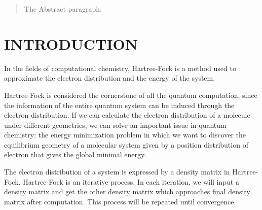 \documentclass[twoside]{article}
\begin{document}
%

%


\begin{abstract}
  The Abstract paragraph.
\end{abstract}

\section{INTRODUCTION}
In the fields of computational chemistry, Hartree-Fock is a method used to approximate the electron distribution and the energy of the system. 


Hartree-Fock is considered the cornerstone of all the quantum computation, since the information of the entire quantum system can be induced through the electron distribution. If we can calculate the electron distribution of a molecule under different geometries, we can solve an important issue in quantum chemistry: the energy minimization problem in which we want to discover the equilibrium geometry of a molecular system given by a position distribution of electron that gives the global minimal energy. 

 
 
The electron distribution of a system is expressed by a density matrix in Hartree-Fock.
Hartree-Fock is an iterative process. In each iteration, we will input a density matrix and get the other density matrix which approaches final density matrix after computation. This process will be repeated until convergence.
\end{document}
